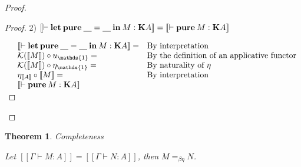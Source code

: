 \documentclass[a4paper]{article}
\newtheorem{theorem}{Theorem}
\begin{document}
\begin{proof}
\begin{proof}
\vspace{\baselineskip}

2) $[\![\vdash {\bf let \: pure \:} \underline{\quad} = \underline {\quad} {\: \bf in \:} M : {\bf K} A]\!] = [\![\vdash {\bf pure \:} M : {\bf K} A]\!]$

$\begin{array}{lll}
&[\![\vdash {\bf let \: pure \:} \underline{\quad} = \underline {\quad} {\: \bf in \:} M : {\bf K} A]\!] = & \text{By interpretation} \\
&\mathcal{K}([\![M]\!]) \circ u_{\mathds{1}} = & \text{By the definition of an applicative functor} \\
&\mathcal{K}([\![M]\!]) \circ \eta_{\mathds{1}} = & \text{By naturality of $\eta$} \\
&\eta_{[\![A]\!]} \circ [\![M]\!] = & \text{By interpretation} \\
&[\![\vdash {\bf pure \:} M : {\bf K} A]\!]&
\end{array}$
\end{proof}

\end{proof}

\begin{theorem} Completeness

Let $[\![\Gamma \vdash M : A]\!] = [\![\Gamma \vdash N : A]\!]$, then $M =_{\beta \eta} N$.
\end{theorem}
\end{document}

